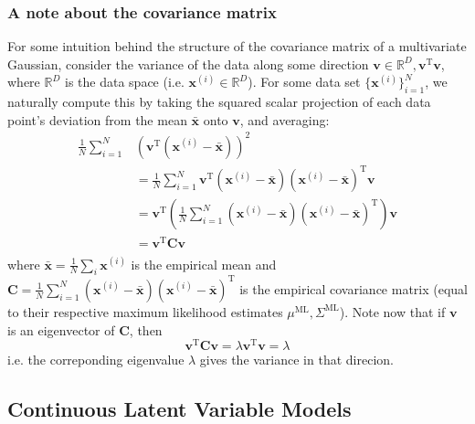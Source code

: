\documentclass[a4paper]{article}
\begin{document}
\subsubsection{A note about the covariance matrix}
For some intuition behind the structure of the covariance matrix of a multivariate Gaussian, consider the variance of the data along some direction $\mathbf{v} \in \mathbb{R}^D, \mathbf{v}^\textrm{T}\mathbf{v}$, where $\mathbb{R}^D$ is the data space (i.e. $\mathbf{x}^{(i)}\in \mathbb{R}^D$). For some data set $\{\mathbf{x}^{(i)}\}_{i=1}^N$, we naturally compute this by taking the squared scalar projection of each data point's deviation from the mean $\bar{\mathbf{x}}$ onto $\mathbf{v}$, and averaging:
\begin{align*}
\frac{1}{N}\sum_{i=1}^N &(\mathbf{v}^\textrm{T}(\mathbf{x}^{(i)} - \bar{\mathbf{x}}))^2 \\
&= \frac{1}{N}\sum_{i=1}^N \mathbf{v}^\textrm{T}(\mathbf{x}^{(i)} - \bar{\mathbf{x}})(\mathbf{x}^{(i)} - \bar{\mathbf{x}})^\textrm{T}\mathbf{v} \\
&= \mathbf{v}^\textrm{T}\left(\frac{1}{N}\sum_{i=1}^N(\mathbf{x}^{(i)} - \bar{\mathbf{x}})(\mathbf{x}^{(i)} - \bar{\mathbf{x}})^\textrm{T}\right)\mathbf{v} \\
&= \mathbf{v}^\textrm{T}\mathbf{C}\mathbf{v} \\
\end{align*}
where $\bar{\mathbf{x}} = \frac{1}{N}\sum_i \mathbf{x}^{(i)}$ is the empirical mean and $\mathbf{C}=\frac{1}{N}\sum_{i=1}^N(\mathbf{x}^{(i)} - \bar{\mathbf{x}})(\mathbf{x}^{(i)} - \bar{\mathbf{x}})^\textrm{T}$ is the empirical covariance matrix (equal to their respective maximum likelihood estimates $\mu^\textrm{ML},\Sigma^\textrm{ML}$). Note now that if $\mathbf{v}$ is an eigenvector of $\mathbf{C}$, then
\[ \mathbf{v}^\textrm{T}\mathbf{C}\mathbf{v} = \lambda \mathbf{v}^\textrm{T}\mathbf{v} = \lambda \]
i.e. the correponding eigenvalue $\lambda$ gives the variance in that direcion.

\subsection{Continuous Latent Variable Models}
\end{document}

